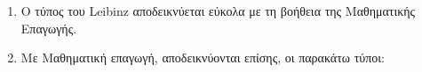\documentclass[a4paper]{book}
\begin{document}
  \begin{rem}
  \item {}
    \begin{enumerate}
      \item Ο τύπος του \textlatin{Leibinz} αποδεικνύεται εύκολα με τη βοήθεια της
        Μαθηματικής Επαγωγής.
      \item Με Μαθηματική επαγωγή, αποδεικνύονται επίσης, οι παρακάτω τύποι:

    \end{enumerate}
  \end{rem}
\end{document}
